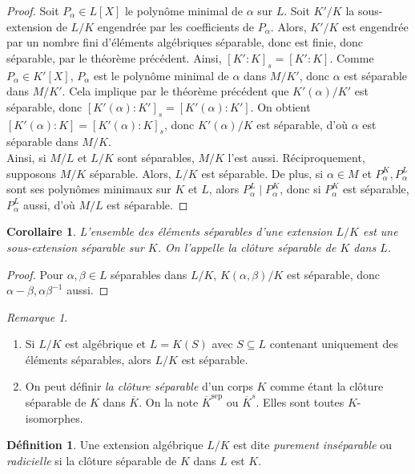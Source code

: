 \documentclass{article}
\newcommand{\sep}{\mathrm{sep}}
\theoremstyle{plain}
\newtheorem{corollary}[theorem]{Corollaire}
\theoremstyle{definition}
\newtheorem{definition}[theorem]{Définition}
\theoremstyle{remark}
\newtheorem*{remark}{Remarque}
\begin{document}
\begin{proof}
    Soit $P_\alpha \in L[X]$ le polynôme minimal de $\alpha$ sur $L$. Soit $K'/K$ la sous-extension de $L/K$ engendrée par les coefficients de $P_\alpha$. Alors, $K'/K$ est engendrée par un nombre fini d'éléments  algébriques séparable, donc est finie, donc séparable, par le théorème précédent. Ainsi, $[K' : K]_s = [K' : K]$. Comme $P_\alpha \in K'[X]$, $P_\alpha$ est le polynôme minimal de $\alpha$ dans $M/K'$, donc $\alpha$ est séparable dans $M/K'$. Cela implique par le théorème précédent que $K'(\alpha)/K'$ est séparable, donc $[K'(\alpha) : K']_s = [K'(\alpha) : K']$. On obtient $[K'(\alpha) : K] = [K'(\alpha) : K]_s$, donc $K'(\alpha)/K$ est séparable, d'où $\alpha$ est séparable dans $M/K$. \\
    Ainsi, si $M/L$ et $L/K$ sont séparables, $M/K$ l'est aussi. Réciproquement, supposons $M/K$ séparable. Alors, $L/K$ est séparable. De plus, si $\alpha \in M$ et $P_\alpha^K, P_\alpha^L$ sont ses polynômes minimaux sur $K$ et $L$, alors $P_\alpha^L \mid P_\alpha^K$, donc si $P_\alpha^K$ est séparable, $P_\alpha^L$ aussi, d'où $M/L$ est séparable.
\end{proof}

\begin{corollary}
    L'ensemble des éléments séparables d'une extension $L/K$ est une sous-extension séparable sur $K$. On l'appelle la \emph{clôture séparable de $K$ dans $L$}.
\end{corollary}

\begin{proof}
    Pour $\alpha,\beta \in L$ séparables dans $L/K$, $K(\alpha,\beta)/K$ est séparable, donc $\alpha - \beta, \alpha \beta^{-1}$ aussi.
\end{proof}

\begin{remark} \leavevmode
    \begin{enumerate}
        \item Si $L/K$ est algébrique et $L = K(S)$ avec $S\subseteq L$ contenant uniquement des éléments séparables, alors $L/K$ est séparable.
        \item On peut définir \emph{\og la \fg clôture séparable} d'un corps $K$ comme étant la clôture séparable de $K$ dans $\overline{K}$. On la note $\overline{K}^\sep$ ou $\overline{K}^s$. Elles sont toutes $K$-isomorphes.
    \end{enumerate}
\end{remark}

\begin{definition}
    Une extension algébrique $L/K$ est dite \emph{purement inséparable} ou \emph{radicielle} si la clôture séparable de $K$ dans $L$ est $K$.
\end{definition}
\end{document}
